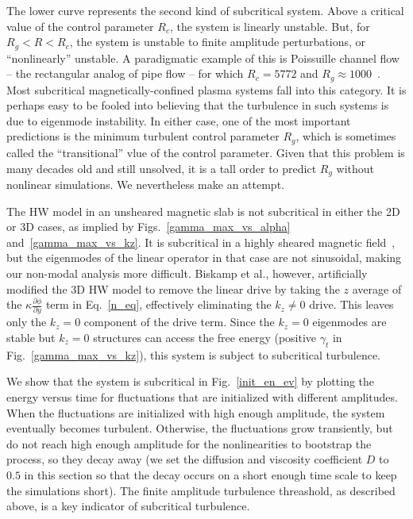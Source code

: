 \documentclass[letter,scriptaddress,twocolumn, prl,showkeys]{revtex4}
\newcommand{\pdiff}[2]{\frac{\partial#1}{\partial#2}}
\begin{document}
The lower curve represents the second kind of subcritical system. Above a critical value of the control parameter $R_c$, the system is linearly unstable. But, for $R_g < R < R_c$, the system is
unstable to finite amplitude perturbations, or ``nonlinearly'' unstable. A paradigmatic example of this is Poissuille channel flow -- the rectangular analog of pipe flow -- for which
$R_c = 5772$ and $R_g \approx 1000$~\cite{grossmann2000}. Most subcritical magnetically-confined plasma systems fall into this category. It is perhaps easy to be fooled into believing that the turbulence
in such systems is due to eigenmode instability. In either case, one of the most important predictions is the minimum turbulent control parameter $R_g$, which is sometimes called the ``transitional''
vlue of the control parameter. Given that this problem is many decades old
and still unsolved, it is a tall order to predict $R_g$ without nonlinear simulations. We nevertheless make an attempt.

The HW model in an unsheared magnetic slab is not subcritical in either the 2D or 3D cases, as implied by Figs.~\ref{gamma_max_vs_alpha} and~\ref{gamma_max_vs_kz}. It is subcritical in a highly sheared
magnetic field~\cite{drake1995}, but the eigenmodes of the linear operator in that case are not sinusoidal, making our non-modal analysis more difficult. 
Biskamp et al., however, artificially modified the
3D HW model to remove the linear drive by taking the $z$ average of the $\kappa \pdiff{\phi}{y}$ term in Eq.~\ref{n_eq}, effectively eliminating the $k_z \ne 0$ drive. This leaves only the $k_z = 0$
component of the drive term. Since the $k_z = 0$ eigenmodes are stable but $k_z = 0$ structures can access the free energy (positive $\gamma_t$ in Fig.~\ref{gamma_max_vs_kz}), this system is subject
to subcritical turbulence.

We show that the system is subcritical in Fig.~\ref{init_en_ev} by plotting the energy versus time for fluctuations that are initialized with different amplitudes. When the fluctuations are initialized
with high enough amplitude, the system eventually becomes turbulent. Otherwise, the fluctuations grow transiently, but do not reach high enough amplitude for the nonlinearities to bootstrap the process,
so they decay away (we set the diffusion and viscosity coefficient $D$ to $0.5$ in this section so that the decay occurs on a short enough time scale to keep the simulations short). 
The finite amplitude turbulence threashold, as described above, is a key indicator of subcritical turbulence.
\end{document}
